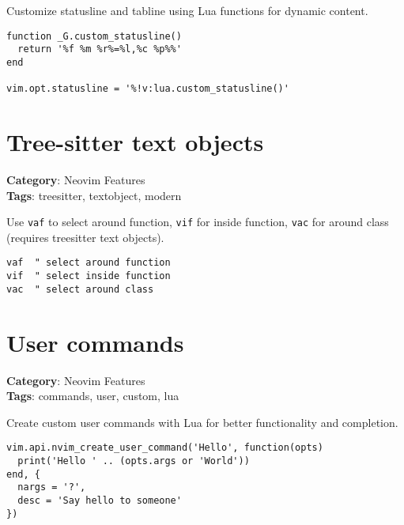 {{{{{{{{{Customize statusline and tabline using Lua functions for dynamic content.

\begin{Exa*}{}
\begin{Verbatim}[fontsize=\footnotesize, breaklines, breakanywhere]
function _G.custom_statusline()
  return '%f %m %r%=%l,%c %p%%'
end

vim.opt.statusline = '%!v:lua.custom_statusline()'
\end{Verbatim}
\end{Exa*}

\section{Tree-sitter text objects}

\textbf{Category}: Neovim Features\\ \textbf{Tags}: treesitter, textobject, modern
\vspace{0.5cm}

Use {\footnotesize \Verb§vaf§} to select around function, {\footnotesize \Verb§vif§} for inside function, {\footnotesize \Verb§vac§} for around class (requires treesitter text objects).

\begin{Exa*}{}
\begin{Verbatim}[fontsize=\footnotesize, breaklines, breakanywhere]
vaf  " select around function
vif  " select inside function
vac  " select around class
\end{Verbatim}
\end{Exa*}

\section{User commands}

\textbf{Category}: Neovim Features\\ \textbf{Tags}: commands, user, custom, lua
\vspace{0.5cm}

Create custom user commands with Lua for better functionality and completion.

\begin{Exa*}{}
\begin{Verbatim}[fontsize=\footnotesize, breaklines, breakanywhere]
vim.api.nvim_create_user_command('Hello', function(opts)
  print('Hello ' .. (opts.args or 'World'))
end, {
  nargs = '?',
  desc = 'Say hello to someone'
})
\end{Verbatim}
\end{Exa*}

}}}}}}}}}
